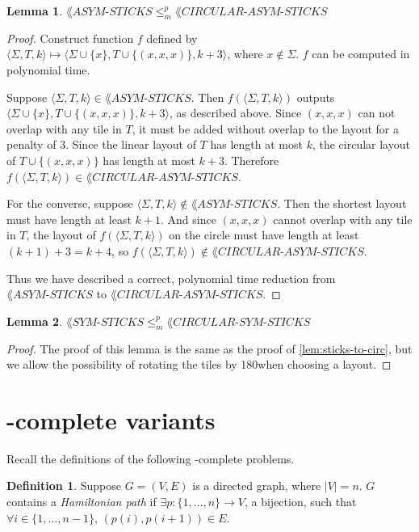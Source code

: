 \documentclass[draft]{article}
\newtheorem{lemma}[lemma]{Lemma}
\theoremstyle{definition} \newtheorem{definition}[definition]{Definition}
\newcommand{\dash}{\mbox{-}}
\newcommand{\defn}[1]{\emph{#1}}
\newcommand{\mor}{\leq_m^p}
\newcommand{\triple}[3]{\langle#1,#2,#3\rangle} %
\newcommand{\asticks}{ASYM\dash STICKS}
\newcommand{\sticks}{SYM\dash STICKS}
\newcommand{\acsticks}{CIRCULAR\dash ASYM\dash STICKS}
\newcommand{\csticks}{CIRCULAR\dash SYM\dash STICKS}
\begin{document}
  \begin{lemma}\label{lem:sticks-to-circ}
    $\lang{\asticks}\mor\lang{\acsticks}$
  \end{lemma}
  \begin{proof}
    Construct function $f$ defined by $\triple{\Sigma}{T}{k} \mapsto
    \triple{\Sigma\cup\{x\}}{T\cup\{(x,x,x)\}}{k+3}$, where
    $x\notin\Sigma$. $f$ can be computed in polynomial time.

    Suppose $\triple{\Sigma}{T}{k}\in\lang{\asticks}$. Then
    $f(\triple{\Sigma}{T}{k})$ outputs
    $\triple{\Sigma\cup\{x\}}{T\cup\{(x,x,x)\}}{k+3}$, as described
    above. Since $(x,x,x)$ can not overlap with any tile in $T$, it must be
    added without overlap to the layout for a penalty of $3$. Since the linear
    layout of $T$ has length at most $k$, the circular layout of
    $T\cup\{(x,x,x)\}$ has length at most $k+3$. Therefore
    $f(\triple{\Sigma}{T}{k})\in\lang{\acsticks}$.

    For the converse, suppose
    $\triple{\Sigma}{T}{k}\notin\lang{\asticks}$. Then the shortest layout must
    have length at least $k+1$. And since $(x, x, x)$ cannot overlap with any
    tile in $T$, the layout of $f(\triple{\Sigma}{T}{k})$ on the circle must
    have length at least $(k+1)+3=k+4$, so
    $f(\triple{\Sigma}{T}{k})\notin\lang{\acsticks}$.

    Thus we have described a correct, polynomial time reduction from
    $\lang{\asticks}$ to $\lang{\acsticks}$.
  \end{proof}

  \begin{lemma}
    $\lang{\sticks}\mor\lang{\csticks}$
  \end{lemma}
  \begin{proof}
    The proof of this lemma is the same as the proof of
    \autoref{lem:sticks-to-circ}, but we allow the possibility of rotating the
    tiles by 180\degree when choosing a layout.
  \end{proof}

  \section{\texorpdfstring{\NP}{NP}-complete variants}

  Recall the definitions of the following \NP-complete problems.

  \begin{definition}\label{def:hampath}
    Suppose $G=(V,E)$ is a directed graph, where $|V|=n$. $G$ contains a
    \defn{Hamiltonian path} if $\exists p\colon\{1,\ldots,n\}\to V$, a
    bijection, such that $\forall i\in\{1,\ldots,n-1\}$, $(p(i), p(i+1))\in E$.
  \end{definition}
\end{document}
